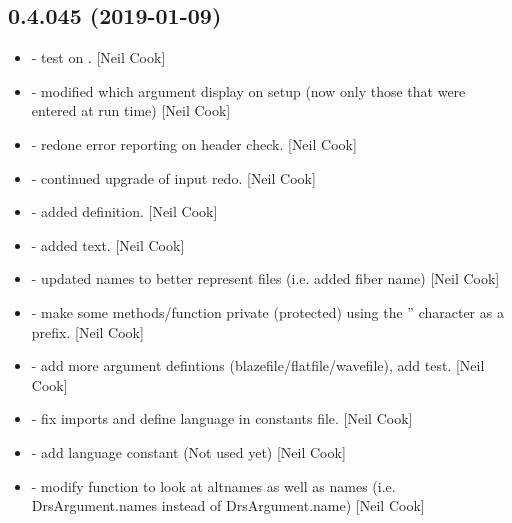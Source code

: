 \documentclass[a4paper,10pt,english]{report}
\begin{document}
\subsection{0.4.045 (2019-01-09)}
\label{\detokenize{misc/changelog:id220}}\begin{itemize}
\item {} 
 - test on . {[}Neil Cook{]}

\item {} 
 - modified which argument display on setup (now only
those that were entered at run time) {[}Neil Cook{]}

\item {} 
 - redone error reporting on header check. {[}Neil Cook{]}

\item {} 
 - continued upgrade of input redo. {[}Neil Cook{]}

\item {} 
 - added  definition. {[}Neil Cook{]}

\item {} 
 - added  text. {[}Neil Cook{]}

\item {} 
 - updated names to better represent files (i.e. added
fiber name) {[}Neil Cook{]}

\item {} 
 - make some methods/function private (protected) using
the ” character as a prefix. {[}Neil Cook{]}

\item {} 
 - add more argument defintions
(blazefile/flatfile/wavefile), add  test. {[}Neil Cook{]}

\item {} 
 - fix imports and define language in constants
file. {[}Neil Cook{]}

\item {} 
 - add language constant (Not used yet) {[}Neil Cook{]}

\item {} 
 - modify  function to look at
altnames as well as names (i.e. DrsArgument.names instead of
DrsArgument.name) {[}Neil Cook{]}


\end{itemize}
\end{document}

